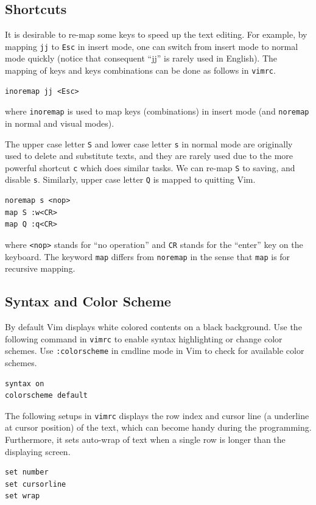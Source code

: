\subsection{Shortcuts}

It is desirable to re-map some keys to speed up the text editing. For example, by mapping \verb|jj| to \verb|Esc| in insert mode, one can switch from insert mode to normal mode quickly (notice that consequent ``jj'' is rarely used in English). The mapping of keys and keys combinations can be done as follows in \verb|vimrc|.
\begin{lstlisting}
inoremap jj <Esc>
\end{lstlisting}
where \verb|inoremap| is used to map keys (combinations) in insert mode (and \verb|noremap| in normal and visual modes).

The upper case letter \verb|S| and lower case letter \verb|s| in normal mode are originally used to delete and substitute texts, and they are rarely used due to the more powerful shortcut \verb|c| which does similar tasks. We can re-map \verb|S| to saving, and disable \verb|s|. Similarly, upper case letter \verb|Q| is mapped to quitting Vim.
\begin{lstlisting}
noremap s <nop>
map S :w<CR>
map Q :q<CR>
\end{lstlisting}
where \verb|<nop>| stands for ``no operation'' and \verb|CR| stands for the ``enter'' key on the keyboard. The keyword \verb|map| differs from \verb|noremap| in the sense that \verb|map| is for recursive mapping.

\subsection{Syntax and Color Scheme}

By default Vim displays white colored contents on a black background. Use the following command in \verb|vimrc| to enable syntax highlighting or change color schemes. Use \verb|:colorscheme| in cmdline mode in Vim to check for available color schemes.
\begin{lstlisting}
syntax on
colorscheme default
\end{lstlisting}

The following setups in \verb|vimrc| displays the row index and cursor line (a underline at cursor position) of the text, which can become handy during the programming. Furthermore, it sets auto-wrap of text when a single row is longer than the displaying screen.
\begin{lstlisting}
set number
set cursorline
set wrap
\end{lstlisting}

